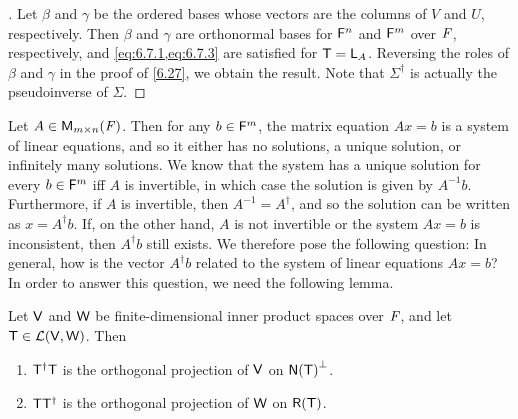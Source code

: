 \begin{proof}[]
  Let \(\beta\) and \(\gamma\) be the ordered bases whose vectors are the columns of \(V\) and \(U\), respectively.
  Then \(\beta\) and \(\gamma\) are orthonormal bases for \(\mathsf{F}^n\) and \(\mathsf{F}^m\) over \(\mathit{F}\), respectively, and \cref{eq:6.7.1,eq:6.7.3} are satisfied for \(\mathsf{T} = \mathsf{L}_A\).
  Reversing the roles of \(\beta\) and \(\gamma\) in the proof of \cref{6.27}, we obtain the result.
  Note that \(\Sigma^{\dag}\) is actually the pseudoinverse of \(\Sigma\).
\end{proof}

\begin{note}
  Let \(A \in \ms\).
  Then for any \(b \in \mathsf{F}^m\), the matrix equation \(Ax = b\) is a system of linear equations, and so it either has no solutions, a unique solution, or infinitely many solutions.
  We know that the system has a unique solution for every \(b \in \mathsf{F}^m\) iff \(A\) is invertible, in which case the solution is given by \(A^{-1} b\).
  Furthermore, if \(A\) is invertible, then \(A^{-1} = A^{\dag}\), and so the solution can be written as \(x = A^{\dag} b\).
  If, on the other hand, \(A\) is not invertible or the system \(Ax = b\) is inconsistent, then \(A^{\dag} b\) still exists.
  We therefore pose the following question:
  In general, how is the vector \(A^{\dag} b\) related to the system of linear equations \(Ax = b\)?
  In order to answer this question, we need the following lemma.
\end{note}

\begin{lem}\label{6.7.10}
  Let \(\mathsf{V}\) and \(\mathsf{W}\) be finite-dimensional inner product spaces over \(\mathit{F}\), and let \(\mathsf{T} \in \mathcal{L}(\mathsf{V}, \mathsf{W})\).
  Then
  \begin{enumerate}
    \item \(\mathsf{T}^{\dag} \mathsf{T}\) is the orthogonal projection of \(\mathsf{V}\) on \(\ns{\T}^{\perp}\).
    \item \(\mathsf{T} \mathsf{T}^{\dag}\) is the orthogonal projection of \(\mathsf{W}\) on \(\rg{\T}\).
  \end{enumerate}
\end{lem}

